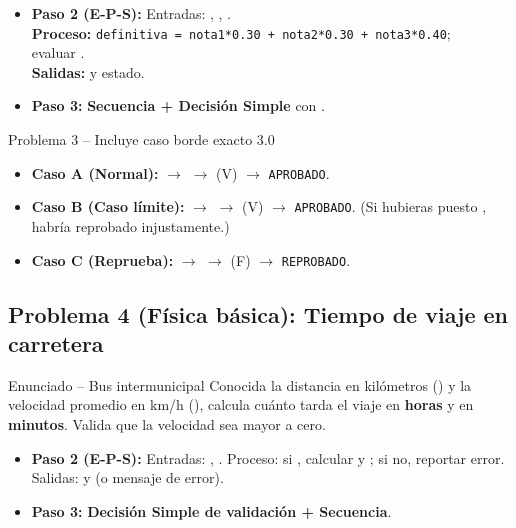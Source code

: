 \documentclass[11pt,letterpaper]{article}
\begin{document}
\begin{itemize}
  \item \textbf{Paso 2 (E-P-S):} Entradas: , , .\\
        \textbf{Proceso:} \texttt{definitiva = nota1*0.30 + nota2*0.30 + nota3*0.40};\\
        evaluar .\\
        \textbf{Salidas:}  y estado.
  \item \textbf{Paso 3:} \textbf{Secuencia + Decisión Simple} con .
\end{itemize}

\begin{pruebaescritorio}{Problema 3 -- Incluye caso borde exacto 3.0}
\begin{itemize}
  \item \textbf{Caso A (Normal):}  $\rightarrow$  $\rightarrow$  (V) $\rightarrow$ \texttt{APROBADO}.
  \item \textbf{Caso B (Caso límite):}  $\rightarrow$  $\rightarrow$  (V) $\rightarrow$ \texttt{APROBADO}. (Si hubieras puesto , habría reprobado injustamente.)
  \item \textbf{Caso C (Reprueba):}  $\rightarrow$  $\rightarrow$  (F) $\rightarrow$ \texttt{REPROBADO}.
\end{itemize}
\end{pruebaescritorio}

\subsection{Problema 4 (Física básica): Tiempo de viaje en carretera}
\begin{analisis}{Enunciado -- Bus intermunicipal}
Conocida la distancia en kilómetros () y la velocidad promedio en km/h (), calcula cuánto tarda el viaje en \textbf{horas} y en \textbf{minutos}. Valida que la velocidad sea mayor a cero.
\end{analisis}

\begin{itemize}
  \item \textbf{Paso 2 (E-P-S):} Entradas: , . Proceso: si , calcular  y ; si no, reportar error. Salidas:  y  (o mensaje de error).
  \item \textbf{Paso 3:} \textbf{Decisión Simple de validación + Secuencia}.
\end{itemize}
\end{document}
